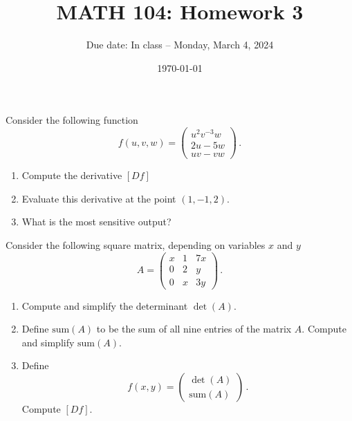\documentclass[12pt]{amsart}
\title{ MATH 104: Homework 3}
\author{Due date: In class -- Monday, March 4, 2024}
\date{\today}
\begin{document}
\maketitle

\begin{problem}
    Consider the following function
    \begin{equation*}
        f(u,v,w) = \begin{pmatrix}
            u^2 v^{-3} w \\ 2u - 5w \\ uv - vw
        \end{pmatrix} \,.
    \end{equation*}
    \begin{enumerate}
        \item Compute the derivative $[Df]$
        \item Evaluate this derivative at the point $(1, -1, 2)$.
        \item What is the most sensitive output?
    \end{enumerate}
\end{problem}

\begin{problem}
    Consider the following square matrix, depending on variables $x$ and $y$
    \begin{equation*}
        A = 
        \begin{pmatrix}
            x & 1 & 7x \\
            0 & 2 & y \\
            0 & x & 3y
        \end{pmatrix} \,.
    \end{equation*}
    \begin{enumerate}
        \item Compute and simplify the determinant $\det(A)$.
        \item Define $\mathrm{sum}(A)$ to be the sum of all nine entries of the
            matrix $A$. Compute and simplify $\mathrm{sum}(A)$.
        \item Define 
            $$ f(x,y) = \begin{pmatrix}
                \det(A) \\
                \mathrm{sum}(A)
            \end{pmatrix}\,.$$
            Compute $[Df]$.
    \end{enumerate}

\end{problem}
\end{document}
